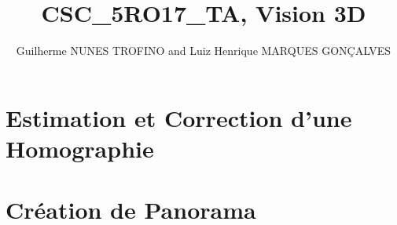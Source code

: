 \documentclass{article}
\title{CSC\_5RO17\_TA, Vision 3D}
\author{Guilherme NUNES TROFINO and Luiz Henrique MARQUES GONÇALVES}
\begin{document}
\maketitle

\newpage\tableofcontents


\section{Estimation et Correction d'une Homographie}

\newpage



\section{Création de Panorama}

\end{document}
